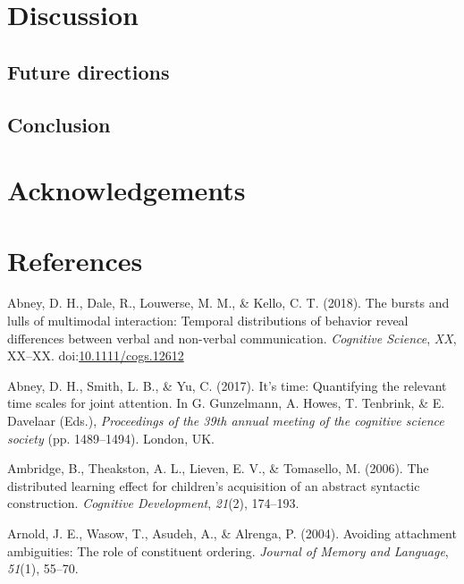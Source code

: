 \documentclass[floatsintext,man]{apa6}
\theoremstyle{definition}
\theoremstyle{definition}
\theoremstyle{definition}
\theoremstyle{remark}
\begin{document}
\section{Discussion}\label{disc}

\subsection{Future directions}\label{disc-future}

\subsection{Conclusion}\label{disc-conclusion}

\section{Acknowledgements}\label{acknowledgements}

\newpage

\section{References}\label{refs}

\begingroup
\setlength{\parindent}{-0.5in} \setlength{\leftskip}{0.5in}

\hypertarget{refs}{}
\hypertarget{ref-abney2018bursts}{}
Abney, D. H., Dale, R., Louwerse, M. M., \& Kello, C. T. (2018). The
bursts and lulls of multimodal interaction: Temporal distributions of
behavior reveal differences between verbal and non-verbal communication.
\emph{Cognitive Science}, \emph{XX}, XX--XX.
doi:\href{https://doi.org/10.1111/cogs.12612}{10.1111/cogs.12612}

\hypertarget{ref-abney2017time}{}
Abney, D. H., Smith, L. B., \& Yu, C. (2017). It's time: Quantifying the
relevant time scales for joint attention. In G. Gunzelmann, A. Howes, T.
Tenbrink, \& E. Davelaar (Eds.), \emph{Proceedings of the 39th annual
meeting of the cognitive science society} (pp. 1489--1494). London, UK.

\hypertarget{ref-ambridge2006distributed}{}
Ambridge, B., Theakston, A. L., Lieven, E. V., \& Tomasello, M. (2006).
The distributed learning effect for children's acquisition of an
abstract syntactic construction. \emph{Cognitive Development},
\emph{21}(2), 174--193.

\hypertarget{ref-arnold2004avoiding}{}
Arnold, J. E., Wasow, T., Asudeh, A., \& Alrenga, P. (2004). Avoiding
attachment ambiguities: The role of constituent ordering. \emph{Journal
of Memory and Language}, \emph{51}(1), 55--70.
\end{document}
